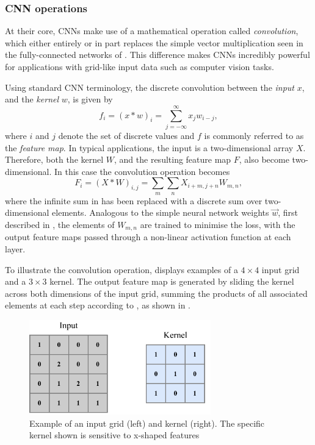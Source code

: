 \subsubsection*{CNN operations} %

At their core, CNNs make use of a mathematical operation called \emph{convolution}, which either
entirely or in part replaces the simple vector multiplication seen in the fully-connected networks
of . This difference makes CNNs incredibly powerful for
applications with grid-like input data such as computer vision tasks.

Using standard CNN terminology, the discrete convolution between the \emph{input} $x$, and the
\emph{kernel} $w$, is given by
\begin{equation}
    f_{i}=(x*w)_{i}=\sum^{\infty}_{j=-\infty}x_{j}w_{i-j},
    \label{eq:convolution}
\end{equation}
where $i$ and $j$ denote the set of discrete values and $f$ is commonly referred to as the
\emph{feature map}. In typical applications, the input is a two-dimensional array $X$. Therefore,
both the kernel $W$, and the resulting feature map $F$, also become two-dimensional. In this case
the convolution operation becomes
\begin{equation}
    F_{i}=(X*W)_{i,j}=\sum_{m}\sum_{n}X_{i+m,j+n}W_{m,n},
    \label{eq:conv}
\end{equation}
where the infinite sum in  has been replaced with a discrete sum over
two-dimensional elements. Analogous to the simple neural network weights $\vec{w}$, first
described in , the elements of $W_{m,n}$ are trained to minimise the loss,
with the output feature maps passed through a non-linear activation function at each layer.

To illustrate the convolution operation,  displays examples of a $4
\times 4$ input grid and a $3 \times 3$ kernel. The output feature map is generated by sliding the
kernel across both dimensions of the input grid, summing the products of all associated elements
at each step according to , as shown in .

\begin{figure} %
    \includegraphics[width=0.7\textwidth]{diagrams/6-cnn/conv_input.pdf}
    \caption[Example of a Convolutional Neural Network input grid and kernel]
    {Example of an input grid (left) and kernel (right). The specific kernel shown is sensitive to
        x-shaped features}
    \label{fig:conv_input}
\end{figure}

